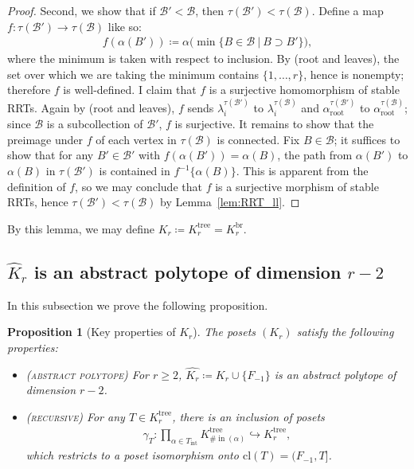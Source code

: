 \documentclass[11pt]{amsart}
\newtheorem{proposition}[theorem]{Proposition}
\theoremstyle{definition}
\theoremstyle{remark}
\theoremstyle{plain}
\newcommand{\sB}{\mathscr{B}}
\newcommand{\on}{\operatorname}
\newcommand{\incom}{\on{in}}
\newcommand{\inte}{{\on{int}}}
\renewcommand{\root}{{\on{root}}}
\newcommand{\tree}{{\on{tree}}}
\newcommand{\br}{{\on{br}}}
\newcommand{\cl}{\mathrm{cl}}
\newcommand{\wh}{\widehat}
\def\hra{\hookrightarrow}
\begin{document}
\begin{proof}
Second, we show that if $\sB' < \sB$, then $\tau(\sB') < \tau(\sB)$.
Define a map $f\colon \tau(\sB') \to \tau(\sB)$ like so:
\begin{align}
f(\alpha(B')) \coloneqq \alpha\bigl(\min\{B \in \sB \:|\: B \supset B'\}\bigr),	
\end{align}
where the minimum is taken with respect to inclusion.
By {\sc (root and leaves)}, the set over which we are taking the minimum contains $\{1,\ldots,r\}$, hence is nonempty; therefore $f$ is well-defined.
I claim that $f$ is a surjective homomorphism of stable RRTs.
Again by {\sc (root and leaves)}, $f$ sends
$\lambda_i^{\tau(\sB')}$ to $\lambda_i^{\tau(\sB)}$
%
and $\alpha_\root^{\tau(\sB')}$ to $\alpha_\root^{\tau(\sB)}$;
since $\sB$ is a subcollection of $\sB'$, $f$ is surjective.
It remains to show that the preimage under $f$ of each vertex in
$\tau(\sB)$
is connected.
Fix $B \in \sB$; it suffices to show that for any $B' \in \sB'$ with $f(\alpha(B')) = \alpha(B)$, the path from $\alpha(B')$ to $\alpha(B)$ in $\tau(\sB')$ is contained in $f^{-1}\{\alpha(B)\}$.
This is apparent from the definition of $f$, so we may conclude that $f$ is a surjective morphism of stable RRTs, hence $\tau(\sB') < \tau(\sB)$ by Lemma~\ref{lem:RRT_ll}.
\end{proof}

\noindent By this lemma, we may define $K_r \coloneqq K_r^\tree = K_r^\br$. \label{p:Kr}

\subsection{\texorpdfstring{$\wh K_r$}{Kr} is an abstract polytope of dimension $r-2$}
\label{ss:Kr_polytope}

In this subsection we prove the following proposition.

\begin{proposition}[Key properties of $K_r$]
\label{prop:Kr_main}
The posets $(K_r)$ satisfy the following properties:
\begin{itemize}
\item[] \textsc{(abstract polytope)} For $r \geq 2$, $\wh{K_r} \coloneqq K_r \cup \{F_{-1}\}$ is an abstract polytope of dimension $r-2$.

\item[] \textsc{(recursive)} For any $T \in K_r^\tree$, there is an inclusion of posets
\begin{align}
\gamma_T\colon \prod_{\alpha \in T_\inte} K_{\#\!\incom(\alpha)}^\tree \hra K_r^\tree,
\end{align}
which restricts to a poset isomorphism onto $\cl(T) = (F_{-1},T]$.
\end{itemize}
\end{proposition}
\end{document}
